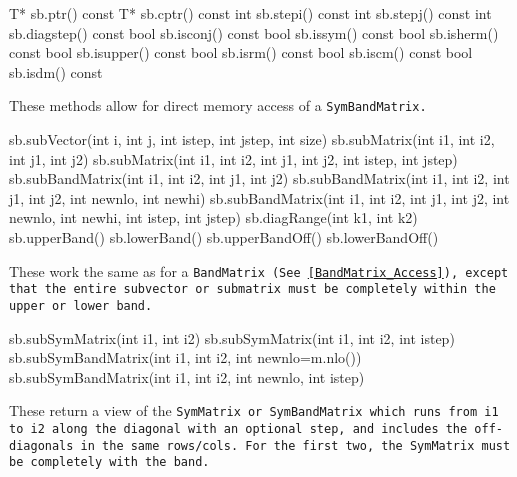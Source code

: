 \begin{tmvcode}
T* sb.ptr()
const T* sb.cptr() const
int sb.stepi() const
int sb.stepj() const
int sb.diagstep() const
bool sb.isconj() const
bool sb.issym() const
bool sb.isherm() const
bool sb.isupper() const
bool sb.isrm() const
bool sb.iscm() const
bool sb.isdm() const
\end{tmvcode}
These methods allow for direct memory access of a \tt{SymBandMatrix}.

\begin{tmvcode}
sb.subVector(int i, int j, int istep, int jstep, int size)
sb.subMatrix(int i1, int i2, int j1, int j2)
sb.subMatrix(int i1, int i2, int j1, int j2, int istep, int jstep)
sb.subBandMatrix(int i1, int i2, int j1, int j2)
sb.subBandMatrix(int i1, int i2, int j1, int j2, int newnlo, int newhi)
sb.subBandMatrix(int i1, int i2, int j1, int j2, int newnlo, int newhi, 
      int istep, int jstep)
sb.diagRange(int k1, int k2)
sb.upperBand()
sb.lowerBand()
sb.upperBandOff()
sb.lowerBandOff()
\end{tmvcode}
These work the same as for a \tt{BandMatrix}
(See \ref{BandMatrix_Access}),
except that the entire
subvector or submatrix must be completely within the upper or lower band.


\begin{tmvcode}
sb.subSymMatrix(int i1, int i2)
sb.subSymMatrix(int i1, int i2, int istep)
sb.subSymBandMatrix(int i1, int i2, int newnlo=m.nlo())
sb.subSymBandMatrix(int i1, int i2, int newnlo, int istep)
\end{tmvcode}
These return a view of the \tt{SymMatrix} or \tt{SymBandMatrix} which runs
from \tt{i1} to \tt{i2} along the diagonal with an optional step,
and includes the off-diagonals in the same rows/cols.  For the first two,
the \tt{SymMatrix} must be completely with the band.

